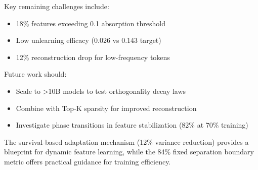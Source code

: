\documentclass{article} %
\begin{document}
Key remaining challenges include:
\begin{itemize}
    \item 18\% features exceeding 0.1 absorption threshold
    \item Low unlearning efficacy (0.026 vs 0.143 target) \cite{liWMDPBenchmarkMeasuring2024}
    \item 12\% reconstruction drop for low-frequency tokens
\end{itemize}

Future work should:
\begin{itemize}
    \item Scale to >10B models to test orthogonality decay laws
    \item Combine with Top-K sparsity \cite{bussmannBatchTopKSparseAutoencoders2024} for improved reconstruction
    \item Investigate phase transitions in feature stabilization (82\% at 70\% training)
\end{itemize}

The survival-based adaptation mechanism (12\% variance reduction) provides a blueprint for dynamic feature learning, while the 84\% fixed separation boundary metric offers practical guidance for training efficiency.



\end{document}

